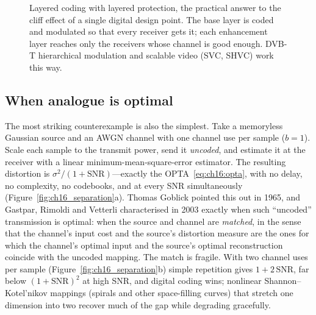 \begin{figure}[htbp]\centering
{}
\caption{Layered coding with layered protection, the practical answer to the cliff effect of a single
digital design point. The base layer is coded and modulated so that every receiver gets it; each
enhancement layer reaches only the receivers whose channel is good enough. DVB-T hierarchical
modulation and scalable video (SVC, SHVC) work this way.}
\label{fig:ch16_layered}
\end{figure}

\subsection{When analogue is optimal}

The most striking counterexample is also the simplest. Take a memoryless Gaussian source and an AWGN
channel with one channel use per sample ($b=1$). Scale each sample to the transmit power, send it
\emph{uncoded}, and estimate it at the receiver with a linear minimum-mean-square-error estimator. The
resulting distortion is $\sigma^2/(1+\mathrm{SNR})$---exactly the OPTA~\eqref{eq:ch16:opta}, with no delay,
no complexity, no codebooks, and at every SNR simultaneously (Figure~\ref{fig:ch16_separation}a).
Thomas Goblick pointed this out in 1965, and Gastpar, Rimoldi and Vetterli characterised in 2003 exactly
when such ``uncoded'' transmission is optimal: when the source and channel are \emph{matched}, in the sense
that the channel's input cost and the source's distortion measure are the ones for which the channel's
optimal input and the source's optimal reconstruction coincide with the uncoded mapping. The match is
fragile. With two channel uses per sample (Figure~\ref{fig:ch16_separation}b) simple repetition gives
$1+2\,\mathrm{SNR}$, far below $(1+\mathrm{SNR})^2$ at high SNR, and digital coding wins; nonlinear
Shannon--Kotel'nikov mappings (spirals and other space-filling curves) that stretch one dimension into two
recover much of the gap while degrading gracefully.


